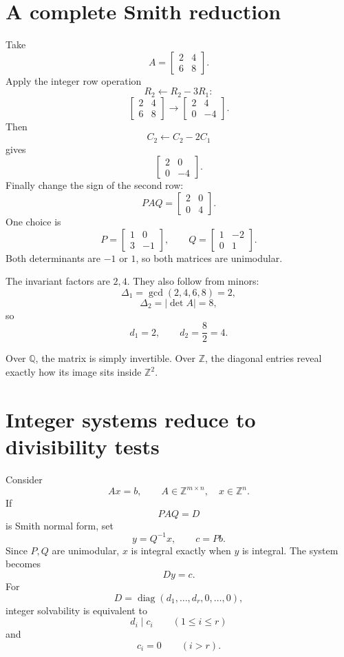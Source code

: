 \section{A complete Smith reduction}

Take
\[
  A=
  \begin{bmatrix}
    2&4\\
    6&8
  \end{bmatrix}.
\]
Apply the integer row operation
\[
  R_2\leftarrow R_2-3R_1:
\]
\[
  \begin{bmatrix}
    2&4\\
    6&8
  \end{bmatrix}
  \longrightarrow
  \begin{bmatrix}
    2&4\\
    0&-4
  \end{bmatrix}.
\]
Then
\[
  C_2\leftarrow C_2-2C_1
\]
gives
\[
  \begin{bmatrix}
    2&0\\
    0&-4
  \end{bmatrix}.
\]
Finally change the sign of the second row:
\[
  \boxed{
  PAQ=
  \begin{bmatrix}
    2&0\\
    0&4
  \end{bmatrix}.}
\]
One choice is
\[
  P=
  \begin{bmatrix}
    1&0\\
    3&-1
  \end{bmatrix},
  \qquad
  Q=
  \begin{bmatrix}
    1&-2\\
    0&1
  \end{bmatrix}.
\]
Both determinants are \(-1\) or \(1\), so both matrices are unimodular.

The invariant factors are \(2,4\).  They also follow from minors:
\[
  \Delta_1=\gcd(2,4,6,8)=2,
\]
\[
  \Delta_2=|\det A|=8,
\]
so
\[
  d_1=2,
  \qquad
  d_2=\frac82=4.
\]

Over \(\mathbb Q\), the matrix is simply invertible.  Over \(\mathbb Z\), the diagonal entries reveal exactly how its image sits inside \(\mathbb Z^2\).

\section{Integer systems reduce to divisibility tests}

Consider
\[
  Ax=b,
  \qquad
  A\in\mathbb Z^{m\times n},
  \quad
  x\in\mathbb Z^n.
\]
If
\[
  PAQ=D
\]
is Smith normal form, set
\[
  y=Q^{-1}x,
  \qquad
  c=Pb.
\]
Since \(P,Q\) are unimodular, \(x\) is integral exactly when \(y\) is integral.  The system becomes
\[
  Dy=c.
\]
For
\[
  D=\operatorname{diag}(d_1,\ldots,d_r,0,\ldots,0),
\]
integer solvability is equivalent to
\[
  d_i\mid c_i
  \qquad(1\le i\le r)
\]
and
\[
  c_i=0
  \qquad(i>r).
\]

